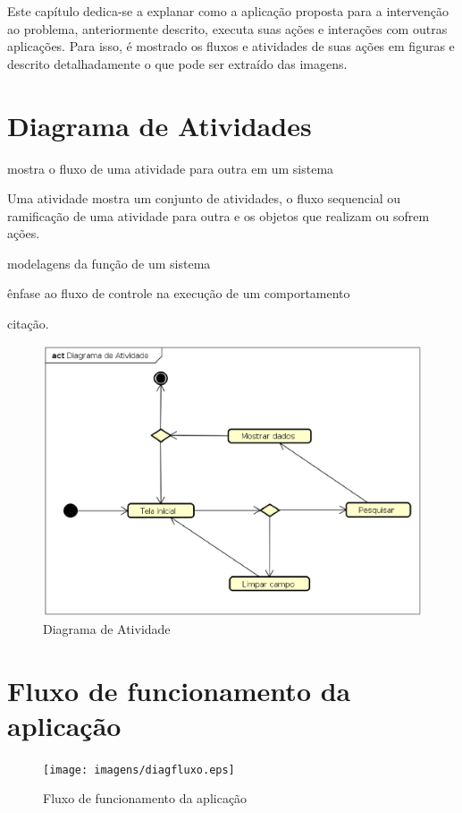 Este capítulo dedica-se a explanar como a aplicação proposta para a intervenção ao problema, anteriormente descrito, executa suas ações e interações com outras aplicações. Para isso, é mostrado os fluxos e atividades de suas ações em figuras e descrito detalhadamente o que pode ser extraído das imagens.

\section{Diagrama de Atividades}
mostra o fluxo de uma atividade para outra em um sistema

Uma atividade mostra um conjunto de atividades, o fluxo sequencial ou ramificação de uma atividade para outra e os objetos que realizam ou sofrem ações.

modelagens da função de um sistema

ênfase ao fluxo de controle na execução de um comportamento 

citação\cite{Booch:2012}.

\begin{figure}[!htb]
        \caption{\label{diagrama1}Diagrama de Atividade}
        \begin{center}
                \includegraphics[width=\textwidth]{imagens/diagact.eps}
        \end{center}
\end{figure}

\section{Fluxo de funcionamento da aplicação}

\begin{figure}[!htb]
        \caption{\label{diagrama1}Fluxo de funcionamento da aplicação}
        \begin{center}
                \texttt{[image: imagens/diagfluxo.eps]}
        \end{center}
\end{figure}
